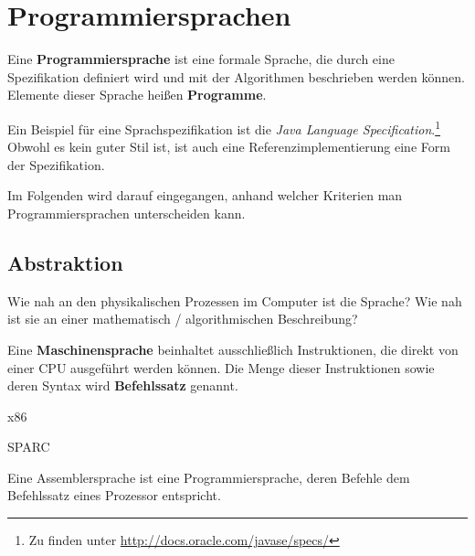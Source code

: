 \chapter{Programmiersprachen}
\begin{definition}%
    Eine \textbf{Programmiersprache} ist eine formale Sprache, die durch eine
    Spezifikation definiert wird und mit der Algorithmen beschrieben werden
    können. Elemente dieser Sprache heißen \textbf{Programme}.
\end{definition}

Ein Beispiel für eine Sprachspezifikation ist die \textit{Java Language Specification}.\footnote{Zu finden unter \url{http://docs.oracle.com/javase/specs/}} Obwohl es kein guter Stil ist, ist auch
eine Referenzimplementierung eine Form der Spezifikation.

Im Folgenden wird darauf eingegangen, anhand welcher Kriterien man 
Programmiersprachen unterscheiden kann.

\section{Abstraktion}
Wie nah an den physikalischen Prozessen im Computer ist die Sprache?
Wie nah ist sie an einer mathematisch / algorithmischen Beschreibung?

\begin{definition}%
    Eine \textbf{Maschinensprache} beinhaltet ausschließlich Instruktionen, die direkt
    von einer CPU ausgeführt werden können. Die Menge dieser Instruktionen 
    sowie deren Syntax wird \textbf{Befehlssatz} genannt.
\end{definition}

\begin{beispiel}[Maschinensprachen]
    \begin{bspenum}
        \item {}x86
        \item {}SPARC
    \end{bspenum}
\end{beispiel}

\begin{definition}[Assembler]%
    Eine Assemblersprache ist eine Programmiersprache, deren Befehle dem
    Befehlssatz eines Prozessor entspricht.
\end{definition}

